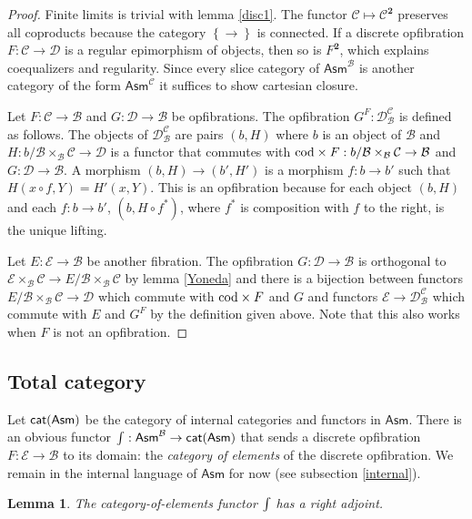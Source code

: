 \documentclass{amsart}
\theoremstyle{plain}
\newtheorem{lemma}[theorem]{Lemma}
\theoremstyle{definition}
\newcommand\cat\mathcal
\newcommand\set[1]{\left\{#1\right\}}
\newcommand\ri{^*}
\newcommand\Asm{\mathsf{Asm}}
\newcommand\sier{{\mathbf 2}}
\begin{document}
\begin{proof} Finite limits is trivial with lemma \ref{disc1}. The functor $\cat C \mapsto \cat C^\sier$ preserves all coproducts because the category $\set\to$ is connected. If a discrete opfibration $F:\cat C\to\cat D$ is a regular epimorphism of objects, then so is $F^\sier$, which explains coequalizers and regularity. Since every slice category of $\Asm^{\cat B}$ is another category of the form $\Asm^{\cat C}$ it suffices to show cartesian closure. 

Let $F:\cat C\to\cat B$ and $G:\cat D\to\cat B$ be opfibrations. The opfibration $G^F:\cat D^{\cat C}_{\cat B}$ is defined as follows. The objects of $\cat D^{\cat C}_{\cat B}$ are pairs $(b,H)$ where $b$ is an object of $\cat B$ and $H:b/\cat B \times_{\cat B} \cat C\to \cat D$ is a functor that commutes with $\cod\times F:b/\cat B \times_{\cat B} \cat C \to \cat B$ and $G:\cat D \to \cat B$. A morphism $(b,H) \to (b', H')$ is a morphism $f:b\to b'$ such that $H(x\circ f,Y) = H'(x,Y)$. This is an opfibration because for each object $(b,H)$ and each $f:b\to b'$, $(b,H\circ f\ri)$, where $f\ri$ is composition with $f$ to the right, is the unique lifting.

Let $E:\cat E\to\cat B$ be another fibration. The opfibration $G:\cat D\to\cat B$ is orthogonal to $\cat E\times_{\cat B}\cat C \to E/\cat B\times_{\cat B} \cat C$ by lemma \ref{Yoneda} and there is a bijection between functors $E/\cat B\times_{\cat B} \cat C \to\cat D$ which commute with $\mathrm{cod}\times F$ and $G$ and functors $\cat E \to \cat D^{\cat C}_{\cat B}$ which commute with $E$ and $G^F$ by the definition given above. Note that this also works when $F$ is not an opfibration.
\end{proof}

\subsection{Total category}
Let $\mathsf{cat(Asm)}$ be the category of internal categories and functors in $\Asm$. There is an obvious functor $\tot:\Asm^{\cat B} \to \catasm$ that sends a discrete opfibration $F:\cat E\to\cat B$ to its domain: the \emph{category of elements} of the discrete opfibration. We remain in the internal language of $\Asm$ for now (see subsection \ref{internal}).

\begin{lemma} The category-of-elements functor $\mathord{\int}$ has a right adjoint. \end{lemma}
\end{document}

